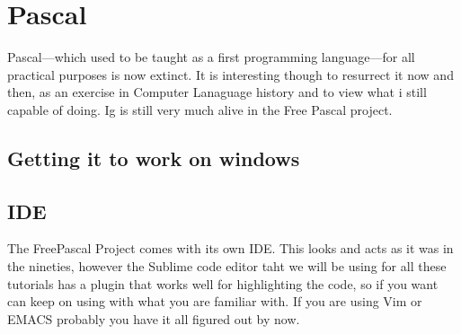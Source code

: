 \chapter{Pascal}

Pascal---which used to be taught as a first programming language---for all practical purposes
is now extinct. It is interesting though to resurrect it now and then, as an exercise
in Computer Lanaguage history and to view what i still capable of doing. Ig is still
very much alive in the Free Pascal project.

\section{Getting it to work on windows}

\section{IDE}

The FreePascal Project comes with its own IDE. This looks and acts as it was in the nineties, however the Sublime code editor taht we will be using for all these tutorials has a plugin that works well for highlighting the code, so if you want can keep on using with what you are familiar with. If you are using Vim or EMACS probably you have it all figured out by now.



